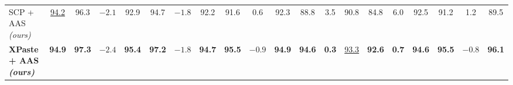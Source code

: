\begin{tabular}{l ccc ccc ccc ccc ccc ccc c}
\midrule
\rowcolor{oursrow} SCP + AAS \emph{(ours)} & \underline{94.2} & 96.3 & $-2.1$ & 92.9 & 94.7 & \underline{$-1.8$} & 92.2 & 91.6 & 0.6 & 92.3 & 88.8 & 3.5 & 90.8 & 84.8 & 6.0 & 92.5 & 91.2 & 1.2 & 89.5 \\
\rowcolor{oursrow} \textbf{XPaste + AAS \emph{(ours)}} & \textbf{94.9} & \textbf{97.3} & \underline{$-2.4$} & \textbf{95.4} & \textbf{97.2} & \underline{$-1.8$} & \textbf{94.7} & \textbf{95.5} & \textbf{\boldmath $-0.9$} & \textbf{94.9} & \textbf{94.6} & \textbf{0.3} & \underline{93.3} & \textbf{92.6} & \textbf{0.7} & \textbf{94.6} & \textbf{95.5} & \textbf{\boldmath $-0.8$} & \textbf{96.1} \\
\bottomrule
\end{tabular}

